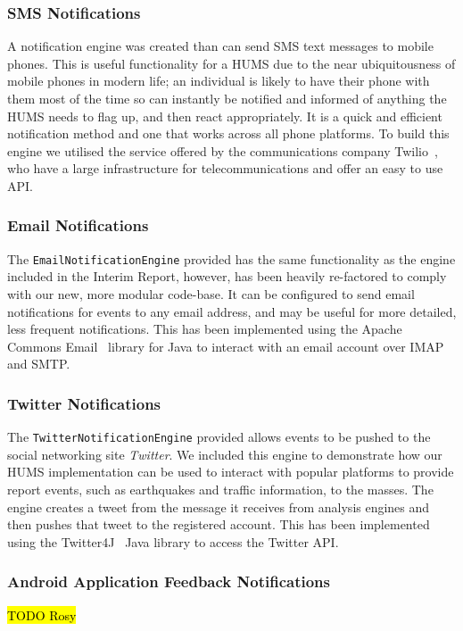 \documentclass[10pt,a4paper]{article}
\begin{document}
\subsubsection{SMS Notifications}
A notification engine was created than can send SMS text messages to mobile phones. This is useful functionality for a HUMS due to the near ubiquitousness of mobile phones in modern life; an individual is likely to have their phone with them most of the time so can instantly be notified and informed of anything the HUMS needs to flag up, and then react appropriately. It is a quick and efficient notification method and one that works across all phone platforms. To build this engine we utilised the service offered by the communications company Twilio~\cite{twilio}, who have a large infrastructure for telecommunications and offer an easy to use API.

\subsubsection{Email Notifications}
The \texttt{EmailNotificationEngine} provided has the same functionality as the engine included in the Interim Report, however, has been heavily re-factored to comply with our new, more modular code-base.
It can be configured to send email notifications for events to any email address, and may be useful for more detailed, less frequent notifications. This has been implemented using the Apache Commons Email~\cite{ac_email} library for Java to interact with an email account over IMAP and SMTP.

\subsubsection{Twitter Notifications}
The \texttt{TwitterNotificationEngine} provided allows events to be pushed to the social networking site \emph{Twitter}. We included this engine to demonstrate how our HUMS implementation can be used to interact with popular platforms to provide report events, such as earthquakes and traffic information, to the masses. The engine creates a tweet from the message it receives from analysis engines and then pushes that tweet to the registered account. This has been implemented using the Twitter4J~\cite{twitter4j} Java library to access the Twitter API.

\subsubsection{Android Application Feedback Notifications}
\hl{TODO Rosy}
\end{document}
